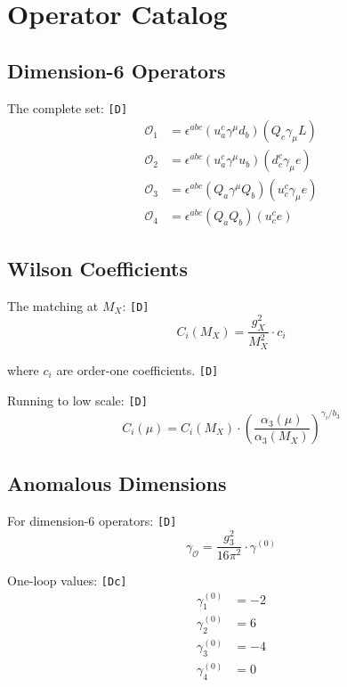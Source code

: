 \documentclass[11pt,a4paper]{article}
\newcommand{\tagD}{\textcolor{green!50!black}{\texttt{[D]}}}
\newcommand{\tagDc}{\textcolor{blue!70!black}{\texttt{[Dc]}}}
\theoremstyle{definition}
\begin{document}
\section{Operator Catalog}
\label{app:operators-cat}

\subsection{Dimension-6 Operators}
\label{app:dim6}

The complete set: \tagD{}
\begin{align}
\label{eq:op-1}
\mathcal{O}_1 &= \epsilon^{abc} (u_a^c \gamma^\mu d_b)(Q_c \gamma_\mu L) \\
\label{eq:op-2}
\mathcal{O}_2 &= \epsilon^{abc} (u_a^c \gamma^\mu u_b)(d_c^c \gamma_\mu e) \\
\label{eq:op-3}
\mathcal{O}_3 &= \epsilon^{abc} (Q_a \gamma^\mu Q_b)(u_c^c \gamma_\mu e) \\
\label{eq:op-4}
\mathcal{O}_4 &= \epsilon^{abc} (Q_a Q_b)(u_c^c e)
\end{align}

\subsection{Wilson Coefficients}
\label{app:wilson}

The matching at $M_X$: \tagD{}
\begin{equation}
\label{eq:wilson-1}
C_i(M_X) = \frac{g_X^2}{M_X^2} \cdot c_i
\end{equation}

where $c_i$ are order-one coefficients. \tagD{}

Running to low scale: \tagD{}
\begin{equation}
\label{eq:wilson-run}
C_i(\mu) = C_i(M_X) \cdot \left(\frac{\alpha_3(\mu)}{\alpha_3(M_X)}\right)^{\gamma_i/b_3}
\end{equation}

\subsection{Anomalous Dimensions}
\label{app:anomalous}

For dimension-6 operators: \tagD{}
\begin{equation}
\label{eq:anom-1}
\gamma_{\mathcal{O}} = \frac{g_3^2}{16\pi^2} \cdot \gamma^{(0)}
\end{equation}

One-loop values: \tagDc{}
\begin{align}
\label{eq:anom-val-1}
\gamma_1^{(0)} &= -2 \\
\label{eq:anom-val-2}
\gamma_2^{(0)} &= 6 \\
\label{eq:anom-val-3}
\gamma_3^{(0)} &= -4 \\
\label{eq:anom-val-4}
\gamma_4^{(0)} &= 0
\end{align}
\end{document}
